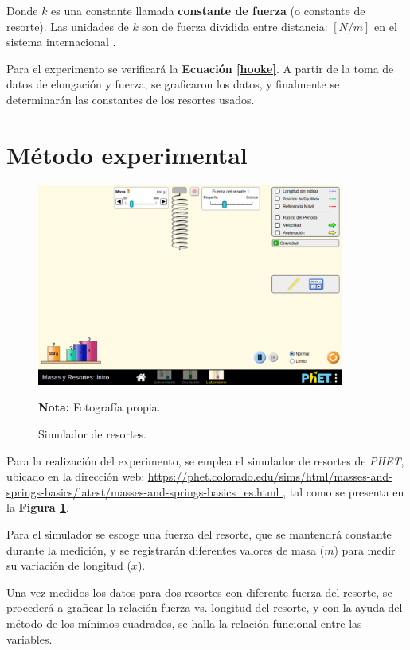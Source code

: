 \documentclass[letter,11pt]{article}
\newcommand{\source}[1]{\vspace{-11pt} \caption*{\small{\textbf{Nota:} {#1}}}}
\begin{document}
Donde $k$ es una constante llamada \textbf{constante de fuerza} (o constante de
resorte). Las unidades de $k$ son de fuerza dividida entre distancia: $[N/m]$ en
el sistema internacional \cite{Young&Freedman}.

Para el experimento se verificará la \textbf{Ecuación \ref{hooke}}.
A partir de la toma de datos de elongación y fuerza, se graficaron los datos, y
finalmente se determinarán las constantes de los resortes usados.

\section{Método experimental}

\begin{figure}
\centering
\includegraphics[width=0.90\textwidth]{resources/f2.eps}
\caption{Simulador de resortes.}
\label{figura2}
\source{Fotografía propia.}
\end{figure}

Para la realización del experimento, se emplea el simulador de resortes de
\emph{PHET}, ubicado en la dirección web: \url{
https://phet.colorado.edu/sims/html/masses-and-springs-basics/latest/masses-and-springs-basics_es.html
}, tal como se presenta en la \textbf{Figura \ref{figura2}}.

Para el simulador se escoge una fuerza del resorte, que se mantendrá constante
durante la medición, y se registrarán diferentes valores de masa ($m$) para
medir su variación de longitud ($x$).

Una vez medidos los datos para dos resortes con diferente fuerza del resorte,
se procederá a graficar la relación fuerza vs. longitud del resorte, y con la
ayuda del método de los mínimos cuadrados, se halla la relación funcional entre
las variables.
\end{document}
